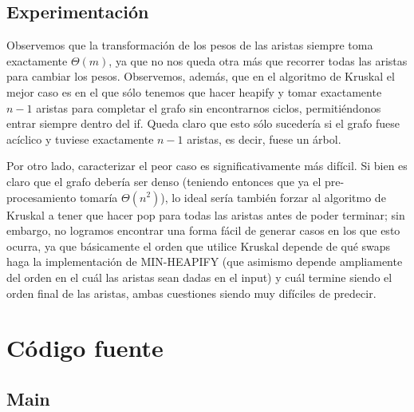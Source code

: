 \documentclass{article}
\theoremstyle{definition}
\theoremstyle{remark}
\begin{document}
\subsection{Experimentación}

Observemos que la transformación de los pesos de las aristas siempre toma exactamente $\Theta(m)$, ya que no nos queda otra más que recorrer todas las aristas para cambiar los pesos. Observemos, además, que en el algoritmo de Kruskal el mejor caso es en el que sólo tenemos que hacer heapify y tomar exactamente $n - 1$ aristas para completar el grafo sin encontrarnos ciclos, permitiéndonos entrar siempre dentro del if. Queda claro que esto sólo sucedería si el grafo fuese acíclico y tuviese exactamente $n - 1$ aristas, es decir, fuese un árbol.

Por otro lado, caracterizar el peor caso es significativamente más difícil. Si bien es claro que el grafo debería ser denso (teniendo entonces que ya el pre-procesamiento tomaría $\Theta(n^2)$), lo ideal sería también forzar al algoritmo de Kruskal a tener que hacer pop para todas las aristas antes de poder terminar; sin embargo, no logramos encontrar una forma fácil de generar casos en los que esto ocurra, ya que básicamente el orden que utilice Kruskal depende de qué swaps haga la implementación de MIN-HEAPIFY (que asimismo depende ampliamente del orden en el cuál las aristas sean dadas en el input) y cuál termine siendo el orden final de las aristas, ambas cuestiones siendo muy difíciles de predecir.

\pagebreak

\section{Código fuente}

\subsection{Main}
\end{document}
